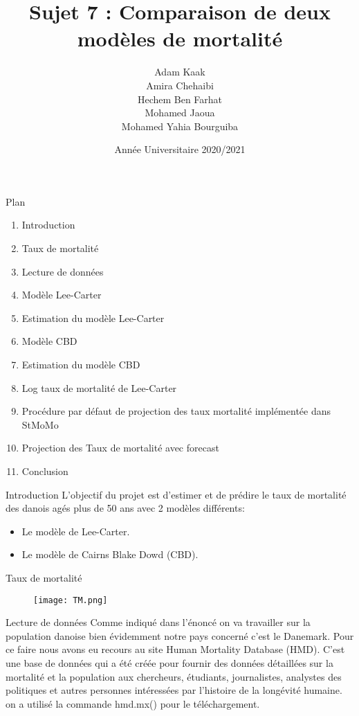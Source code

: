\documentclass[11pt]{beamer}
\author{Adam Kaak \\Amira Chehaibi  \\Hechem Ben Farhat \\Mohamed Jaoua \\Mohamed Yahia Bourguiba}
\title{Sujet 7 : Comparaison de deux modèles de mortalité}
\date{Année Universitaire 2020/2021}
\begin{document}
\begin{frame}
\titlepage
\end{frame}


\begin{frame}{Plan}
\begin{enumerate}
\item Introduction
\item Taux de mortalité 
\item Lecture de données
\item Modèle Lee-Carter
\item Estimation du modèle Lee-Carter
\item Modèle CBD
\item Estimation du modèle CBD
\item Log taux de mortalité de Lee-Carter
\item Procédure par défaut de projection des taux mortalité implémentée dans StMoMo
\item Projection des Taux de mortalité avec forecast
\item Conclusion
\end{enumerate}
\end{frame}

\begin{frame}{Introduction}
L’objectif du projet est d'estimer et de prédire le taux de mortalité des danois agés plus de 50 ans avec 2 modèles différents: 
\begin{itemize}
    \item Le modèle de Lee-Carter.
    \item Le modèle de Cairns Blake Dowd (CBD).
\end{itemize}
\end{frame}

\begin{frame}{Taux de mortalité}
\begin{figure}[!htb]
    \centering
    \texttt{[image: TM.png]}
\end{figure}
\end{frame}

\begin{frame}{Lecture de données}
Comme indiqué dans l’énoncé on va travailler sur la population danoise bien évidemment notre pays concerné c’est le Danemark. Pour ce faire nous avons eu recours au site Human Mortality Database (HMD). C’est une base de données qui a été créée pour fournir des données détaillées sur la mortalité et la population aux chercheurs, étudiants, journalistes,
analystes des politiques et autres personnes intéressées par l’histoire de la longévité humaine.
on a utilisé la commande hmd.mx() pour le téléchargement. 
\end{frame}
\end{document}
